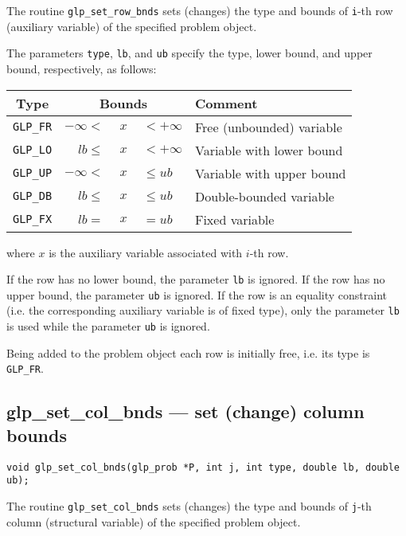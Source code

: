 \description

The routine \verb|glp_set_row_bnds| sets (changes) the type and bounds
of \verb|i|-th row (auxiliary variable) of the specified problem
object.

The parameters \verb|type|, \verb|lb|, and \verb|ub| specify the type,
lower bound, and upper bound, respectively, as follows:

\begin{center}
\begin{tabular}{cr@{}c@{}ll}
Type & \multicolumn{3}{c}{Bounds} & Comment \\
\hline
\verb|GLP_FR| & $-\infty <$ &$\ x\ $& $< +\infty$
   & Free (unbounded) variable \\
\verb|GLP_LO| & $lb \leq$ &$\ x\ $& $< +\infty$
   & Variable with lower bound \\
\verb|GLP_UP| & $-\infty <$ &$\ x\ $& $\leq ub$
   & Variable with upper bound \\
\verb|GLP_DB| & $lb \leq$ &$\ x\ $& $\leq ub$
   & Double-bounded variable \\
\verb|GLP_FX| & $lb =$ &$\ x\ $& $= ub$
   & Fixed variable \\
\end{tabular}
\end{center}

\noindent
where $x$ is the auxiliary variable associated with $i$-th row.

If the row has no lower bound, the parameter \verb|lb| is ignored. If
the row has no upper bound, the parameter \verb|ub| is ignored. If the
row is an equality constraint (i.e. the corresponding auxiliary
variable is of fixed type), only the parameter \verb|lb| is used while
the parameter \verb|ub| is ignored.

Being added to the problem object each row is initially free, i.e. its
type is \verb|GLP_FR|.

\subsection{glp\_set\_col\_bnds --- set (change) column bounds}

\synopsis

{\tt void glp\_set\_col\_bnds(glp\_prob *P, int j, int type,
double lb, double ub);}

\description

The routine \verb|glp_set_col_bnds| sets (changes) the type and bounds
of \verb|j|-th column (structural variable) of the specified problem
object.

